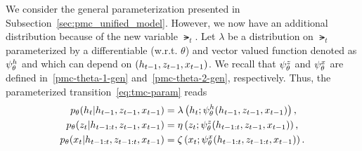We consider the general parameterization presented in 
Subsection~\ref{sec:pmc_unified_model}. 
However, we now have an additional distribution because of the new variable $\lat_t$.
Let $\lambda$ be a distribution on $\lat_t$ parameterized by a differentiable (w.r.t. $\theta$) and 
vector valued function denoted as $\psi^{h}_{\theta}$ and which can depend on 
$(h_{t-1},z_{t-1},x_{t-1})$.
We recall that $\psi^{z}_{\theta}$ and $\psi^{x}_{\theta}$ are defined in~\eqref{pmc-theta-1-gen}
and~\eqref{pmc-theta-2-gen}, respectively.
Thus, the parameterized transition~\eqref{eq:tmc-param} reads
\begin{equation*}
    \begin{aligned}
    p_{\theta}(h_t|h_{t-1},z_{t-1},x_{t-1})  &= \lambda\left(h_t; \psi^{h}_{\theta}(h_{t-1},z_{t-1},x_{t-1})\right) \text{,} \\
    p_{\theta}(z_t|h_{t-1:t},z_{t-1},x_{t-1})&=\eta \left(z_t;\psi^{z}_{\theta}(h_{t-1:t},z_{t-1},x_{t-1})\right) \text{,}\\
    p_{\theta}(x_t|h_{t-1:t},z_{t-1:t},x_{t-1})&=\zeta\left(x_t;\psi^{x}_{\theta}(h_{t-1:t},z_{t-1:t},x_{t-1}) \right) \text{.}
    \end{aligned}
\end{equation*}

